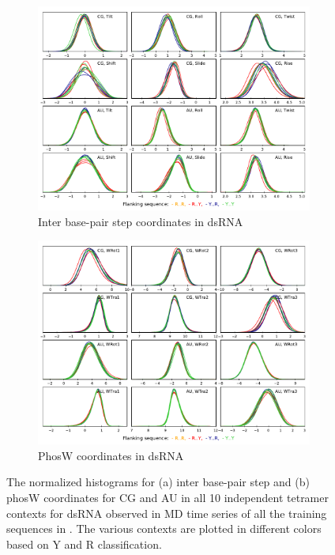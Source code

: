 \begin{figure}[H]
  \begin{subfigure}{15cm}
    \centering\includegraphics[width=15cm,trim=0cm 0cm 0cm 0.6cm]{images/RNA_inter_CG_AU.pdf}
    \caption{Inter base-pair step coordinates in dsRNA}
  \end{subfigure}
  \begin{subfigure}{15cm}
    \centering\includegraphics[width=15cm]{images/RNA_phosW_CG_AU.pdf}
    \caption{PhosW coordinates in dsRNA}
  \end{subfigure}
\caption{The normalized histograms for (a) inter base-pair step and (b) phosW coordinates for CG and AU in all 10 independent tetramer contexts for dsRNA observed in MD time series of all the training sequences in \Lbrna. The various contexts are plotted in different colors based on Y and R classification. 
}
\label{c3:fig_distr_3}
\end{figure}


